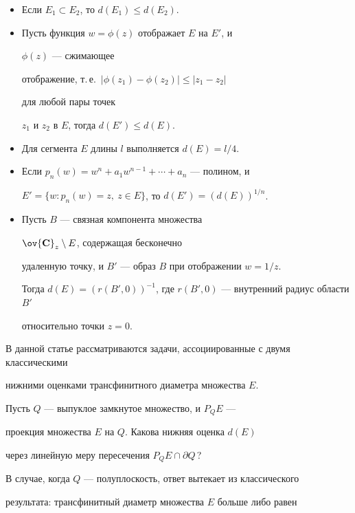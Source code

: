 \begin{itemize}


\item[I.] Если $E_1\subset E_2$, то $d(E_1)\leq d(E_2)$.


\item[II.] Пусть функция $w=\phi (z)$ отображает $E$ на $E'$, и 


$\phi (z)$ --- сжимающее


отображение, т.\,е.~$|\phi(z_1)-\phi(z_2)|\leq |z_1-z_2|$ 


для любой пары точек 


$z_1$ и $z_2$ в $E$, тогда $d(E')\leq d(E)$.


\item[III.] Для сегмента $E$ длины $l$ выполняется $d(E)=l/4$.


\item[IV.] Если $p_n(w)=w^n+a_1w^{n-1}+\dotsb+a_n$ --- полином, и


$E'=\{ w: p_n(w)=z,\ z\in E\}$, то $d(E')=(d(E))^{1/n}$.


\item[V.] Пусть $B$ --- связная компонента множества


$\ov {\bold C}_z\setminus E$, содержащая бесконечно


удаленную точку, и $B'$ --- образ $B$ при отображении $w=1/z$.


Тогда $d(E)=(r(B',0))^{-1}$, где $r(B',0)$ --- внутренний радиус области $B'$


относительно точки $z=0$.


\end{itemize}


   


В данной статье рассматриваются задачи, ассоциированные с двумя классическими


нижними оценками трансфинитного диаметра множества $E$. 





Пусть $Q$ --- выпуклое замкнутое множество, и $P_Q E$ ---


проекция множества $E$ на $Q$. Какова нижняя оценка $d(E)$


через линейную меру пересечения $P_Q E\cap\partial Q$\,?


В случае, когда $Q$ --- полуплоскость, ответ вытекает из классического 


результата: трансфинитный диаметр множества $E$  больше либо равен


